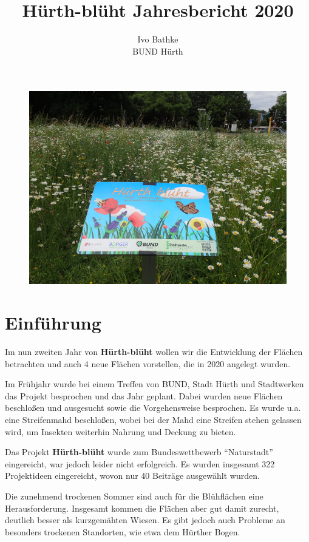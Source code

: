 \documentclass[10pt]{article}
\title{\textbf{Hürth-blüht Jahresbericht 2020}}
\author{Ivo Bathke\\
		BUND Hürth\\}
\date{}
\begin{document}
\maketitle

\begin{figure}[h!]
  \includegraphics[width=\linewidth]{img/titel.jpg}
\end{figure}

\newpage

\section{Einführung}
Im nun zweiten Jahr von \textbf{Hürth-blüht} wollen wir die Entwicklung der Flächen betrachten und auch 4 neue Flächen vorstellen, die in 2020 angelegt wurden.


Im Frühjahr wurde bei einem Treffen von BUND, Stadt Hürth und Stadtwerken das Projekt besprochen und das Jahr geplant. Dabei wurden neue Flächen beschloßen und ausgesucht sowie die Vorgehensweise besprochen.
Es wurde u.a. eine Streifenmahd beschloßen, wobei bei der Mahd eine Streifen stehen gelassen wird, um Insekten weiterhin Nahrung und Deckung zu bieten.

Das Projekt \textbf{Hürth-blüht} wurde zum Bundeswettbewerb "`Naturstadt"' eingereicht, war jedoch leider nicht erfolgreich. Es wurden insgesamt 322 Projektideen eingereicht, wovon nur 40 Beiträge ausgewählt wurden.

Die zunehmend trockenen Sommer sind auch für die Blühflächen eine Herausforderung. Insgesamt kommen die Flächen aber gut damit zurecht, deutlich besser als kurzgemähten Wiesen.
Es gibt jedoch auch Probleme an besonders trockenen Standorten, wie etwa dem Hürther Bogen.
\end{document}
